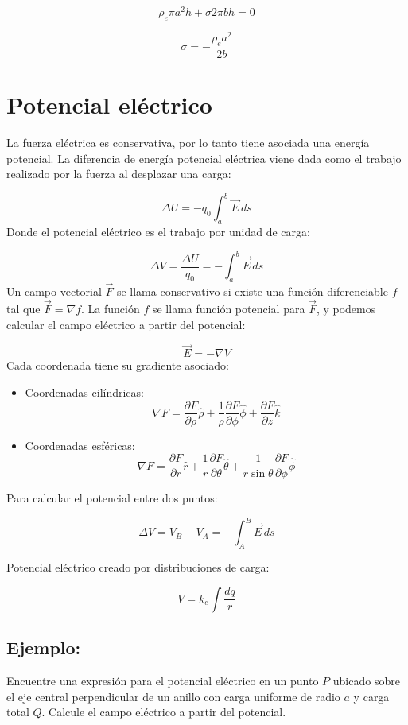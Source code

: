 \documentclass[a4paper,12pt]{article}
\begin{document}
\[
\rho_e \pi a^2 h + \sigma 2\pi b h = 0
\]

\[
\sigma = - \frac{\rho_e a^2}{2b}
\]
\newpage
\noindent
\section{Potencial eléctrico}
\noindent
La fuerza eléctrica es conservativa, por lo tanto tiene asociada una energía potencial.  
La diferencia de energía potencial eléctrica viene dada como el trabajo realizado por la fuerza al desplazar una carga:

\[
\Delta U = - q_0 \int_{a}^{b} \vec{E} \, ds
\]
Donde el potencial eléctrico es el trabajo por unidad de carga:

\[
\Delta V = \frac{\Delta U}{q_0} = - \int_{a}^{b} \vec{E} \, ds
\]
Un campo vectorial $\vec{F}$ se llama conservativo si existe una función diferenciable $f$ tal que $\vec{F} = \nabla f$.  
La función $f$ se llama función potencial para $\vec{F}$, y podemos calcular el campo eléctrico a partir del potencial:

\[
\vec{E} = - \nabla V
\]
Cada coordenada tiene su gradiente asociado:

\begin{itemize}
    \item Coordenadas cilíndricas: 
    \[
    \nabla F = \frac{\partial F}{\partial \rho}\hat{\rho} + \frac{1}{\rho}\frac{\partial F}{\partial \phi}\hat{\phi} + \frac{\partial F}{\partial z}\hat{k}
    \]
    \item Coordenadas esféricas:
    \[
    \nabla F = \frac{\partial F}{\partial r}\hat{r} + \frac{1}{r}\frac{\partial F}{\partial \theta}\hat{\theta} + \frac{1}{r\sin\theta}\frac{\partial F}{\partial \phi}\hat{\phi}
    \]
\end{itemize}

Para calcular el potencial entre dos puntos:

\[
\Delta V = V_B - V_A = - \int_{A}^{B} \vec{E}\, ds
\]

Potencial eléctrico creado por distribuciones de carga:

\[
V = k_e \int \frac{dq}{r}
\]

\subsection*{Ejemplo:}
\noindent
Encuentre una expresión para el potencial eléctrico en un punto $P$ ubicado sobre el eje central perpendicular de un anillo con carga uniforme de radio $a$ y carga total $Q$. Calcule el campo eléctrico a partir del potencial.
\end{document}
